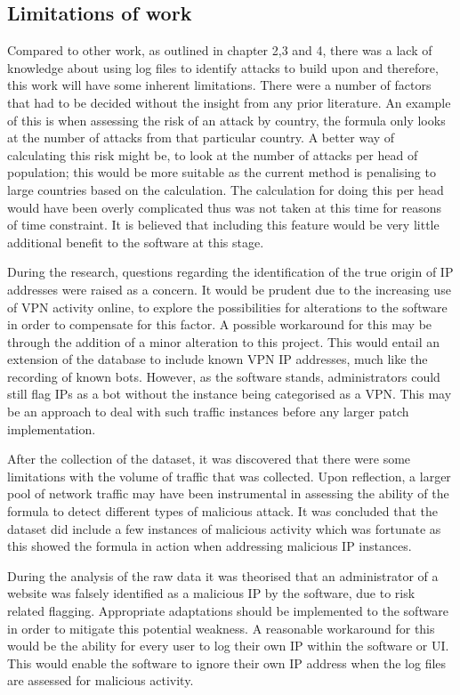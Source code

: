 \subsection{Limitations of work}

Compared to other work, as outlined in chapter 2,3 and 4, there was a lack of knowledge about using log files to identify attacks  to build upon and therefore, this work will have some inherent limitations. There were a number of factors that had to be decided without the insight from any prior literature. An example of this is when assessing the risk of an attack by country, the formula only looks at the number of attacks from that particular country. A better way of calculating this risk might be, to look at the number of attacks per head of population; this would be more suitable as the current method is penalising to large countries based on the calculation. The calculation for doing this per head would have been overly complicated thus was not taken at this time for reasons of time constraint. It is believed that including this feature would be very little additional benefit to the software at this stage.

During the research, questions regarding the identification of the true origin of IP addresses were raised as a concern. It would be prudent due to the increasing use of VPN activity online, to explore the possibilities for alterations to the software in order to compensate for this factor. A possible workaround for this may be through the addition of a minor alteration to this project. This would entail an extension of the database to include known VPN IP addresses, much like the recording of known bots. However, as the software stands, administrators could still flag IPs as a bot without the instance being categorised as a VPN. This may be an approach to deal with such traffic instances before any larger patch implementation.

After the collection of the dataset, it was discovered that there were some limitations with the volume of traffic that was collected. Upon reflection, a larger pool of network traffic may have been instrumental in assessing the ability of the formula to detect different types of malicious attack. It was concluded that the dataset did include a few instances of malicious activity which was fortunate as this showed the formula in action when addressing malicious IP instances.

During the analysis of the raw data it was theorised that an administrator of a website was falsely identified as a malicious IP by the software, due to risk related flagging. Appropriate adaptations should be implemented to the software in order to mitigate this potential weakness. A reasonable workaround for this would be the ability for every user to log their own IP within the software or UI. This would enable the software to ignore their own IP address when the log files are assessed for malicious activity.

